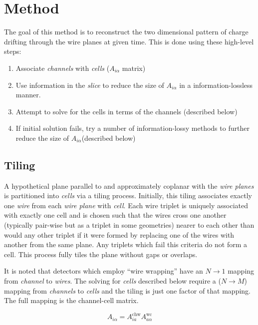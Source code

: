 \documentclass[letter]{article}
\def\mAchc{A_{i\alpha}}
\def\Achc{$\mAchc$\xspace}
\def\mAchw{A^{\mathrm{chw}}_{ia}}
\def\mAwc{A^{\mathrm{wc}}_{a\alpha}}
\begin{document}
\section{Method}

The goal of this method is to reconstruct the two dimensional pattern
of charge drifting through the wire planes at given time.
This is done using these high-level steps:

\begin{enumerate}
\item Associate \textit{channels} with \textit{cells} (\Achc matrix)
\item Use information in the \textit{slice} to reduce the size of
  \Achc in a information-lossless manner.
\item Attempt to solve for the cells in terms of the channels (described below)
\item If initial solution fails, try a number of information-lossy
  methods to further reduce the size of \Achc (described below)
\end{enumerate}

\subsection{Tiling}

A hypothetical plane parallel to and approximately coplanar with the
\textit{wire planes} is partitioned into \textit{cells} via a tiling
process.
Initially, this tiling associates exactly one \textit{wire} from each
\textit{wire plane} with \textit{cell}.
Each wire triplet is uniquely associated with exactly one cell and is
chosen such that the wires cross one another (typically pair-wise but
as a triplet in some geometries) nearer to each other than would any
other triplet if it were formed by replacing one of the wires with
another from the same plane.
Any triplets which fail this criteria do not form a cell.
This process fully tiles the plane without gaps or overlaps.

It is noted that detectors which employ ``wire wrapping'' have an $N
\to 1$ mapping from \textit{channel} to \textit{wires}.
The solving for \textit{cells} described below require a ($N \to M$)
mapping from \textit{channels} to \textit{cells} and the tiling is
just one factor of that mapping.
The full mapping is the channel-cell matrix.

\begin{equation}
  \label{eq:Achc}
  \mAchc = \mAchw \mAwc
\end{equation}
\end{document}
